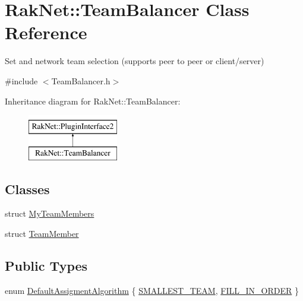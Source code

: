 \hypertarget{class_rak_net_1_1_team_balancer}{\section{Rak\-Net\-:\-:Team\-Balancer Class Reference}
\label{class_rak_net_1_1_team_balancer}
}


Set and network team selection (supports peer to peer or client/server)  




{\ttfamily \#include $<$Team\-Balancer.\-h$>$}

Inheritance diagram for Rak\-Net\-:\-:Team\-Balancer\-:\begin{figure}[H]
\begin{center}
\leavevmode
\includegraphics[height=2.000000cm]{class_rak_net_1_1_team_balancer}
\end{center}
\end{figure}
\subsection*{Classes}
\begin{DoxyCompactItemize}
\item 
struct \hyperlink{struct_rak_net_1_1_team_balancer_1_1_my_team_members}{My\-Team\-Members}
\item 
struct \hyperlink{struct_rak_net_1_1_team_balancer_1_1_team_member}{Team\-Member}
\end{DoxyCompactItemize}
\subsection*{Public Types}
\begin{DoxyCompactItemize}
\item 
enum \hyperlink{class_rak_net_1_1_team_balancer_a615ce461958441f9a0a559ba14610172}{Default\-Assigment\-Algorithm} \{ \hyperlink{class_rak_net_1_1_team_balancer_a615ce461958441f9a0a559ba14610172ab1c6831e34276d7f8c8327f292f0afb3}{S\-M\-A\-L\-L\-E\-S\-T\-\_\-\-T\-E\-A\-M}, 
\hyperlink{class_rak_net_1_1_team_balancer_a615ce461958441f9a0a559ba14610172a4ab0273a366abf56d2680837297b1241}{F\-I\-L\-L\-\_\-\-I\-N\-\_\-\-O\-R\-D\-E\-R}
 \}
\end{DoxyCompactItemize}
